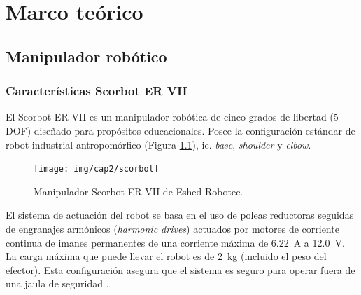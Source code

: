 \chapter{Marco teórico}

\section{Manipulador robótico}

\subsection{Características Scorbot ER VII}

El Scorbot-ER VII es un  manipulador robótica de cinco grados de libertad (5 DOF) diseñado para propósitos educacionales. Posee la configuración estándar de robot industrial antropomórfico (Figura \ref{cap2_scorbot}), ie. \textit{base}, \textit{shoulder} y \textit{elbow}.

\begin{figure}[ht]
  \centering
  \texttt{[image: img/cap2/scorbot]}
  \caption{Manipulador Scorbot ER-VII de Eshed Robotec.}
  \label{cap2_scorbot}
\end{figure}

El sistema de actuación del robot se basa en el uso de poleas reductoras seguidas de engranajes armónicos (\textit{harmonic drives}) actuados por motores de corriente continua de imanes permanentes de una corriente máxima de \SI{6,22}{\ampere} a \SI{12,0}{\volt}. La carga máxima que puede llevar el robot es de \SI{2}{\kilo\gram} (incluido el peso del efector). Esta configuración asegura que el sistema es seguro para operar fuera de una jaula de seguridad \cite{scorbot1998}.



